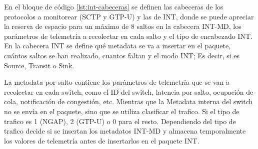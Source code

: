  En el bloque de código \ref{lst:int-cabeceras} se definen las cabeceras de los protocolos a monitorear (SCTP y GTP-U) y las de INT, donde se puede apreciar la reserva de espacio para un máximo de 8 saltos en la cabecera INT-MD, los parámetros de telemetría a recolectar en cada salto y el tipo de encabezado INT.
 En la cabecera INT se define qué metadata se va a insertar en el paquete, cuántos saltos se han realizado, cuantos faltan y el modo INT; Es decir, si es Source, Transit o Sink.
 

 La metadata por salto contiene los parámetros de telemetría que se van a recolectar en cada switch, como el ID del switch, latencia por salto, ocupación de cola, notificación de congestión, etc.
 Mientras que la Metadata interna del switch no se envía en el paquete, sino que se utiliza clasificar el trafico. Si el tipo de trafico es 1 (NGAP), 2 (GTP-U) o 0 para el resto. Dependiendo del tipo de trafico decide si se insertan los metadatos INT-MD y almacena temporalmente los valores de telemetría antes de insertarlos en el paquete INT.

